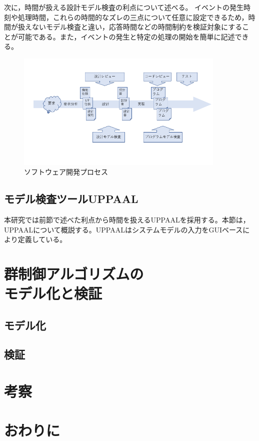 \documentclass{tpu-sotu}
\begin{document}
	次に，時間が扱える設計モデル検査の利点について述べる。
	イベントの発生時刻や処理時間，これらの時間的なズレの三点について任意に設定できるため，時間が扱えないモデル検査と違い，応答時間などの時間制約を検証対象にすることが可能である。また，イベントの発生と特定の処理の開始を簡単に記述できる。
	\begin{figure}[htbp]
	\centering
	\includegraphics[width=100mm]{developmentProcess.png}
	\caption{ソフトウェア開発プロセス}
	\label{develP}
	\end{figure}

	\section{モデル検査ツールUPPAAL}
	本研究では前節で述べた利点から時間を扱えるUPPAALを採用する。本節は，UPPAALについて概説する。UPPAALはシステムモデルの入力をGUIベースにより定義している。
	
\chapter{群制御アルゴリズムの\\モデル化と検証}
	\section{モデル化}
	\section{検証}
\chapter{考察}
\chapter{おわりに}
\acknowledgements
\begin{thebibliography}{1}
\end{thebibliography}
\end{document}
